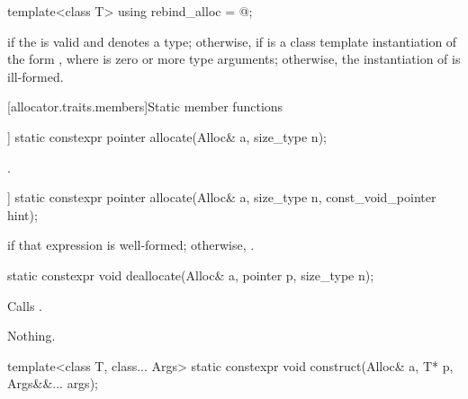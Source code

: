 %
\begin{itemdecl}
template<class T> using rebind_alloc = @\seebelow@;
\end{itemdecl}

\begin{itemdescr}
\pnum
\templalias {} if
the   is valid and denotes a
type; otherwise,
 if  is a class template instantiation
of the form , where  is zero or more type arguments;
otherwise, the instantiation of  is ill-formed.
\end{itemdescr}

[allocator.traits.members]{Static member functions}

%
\begin{itemdecl}
[[nodiscard]] static constexpr pointer allocate(Alloc& a, size_type n);
\end{itemdecl}

\begin{itemdescr}
\pnum
\returns
{}.
\end{itemdescr}

%
\begin{itemdecl}
[[nodiscard]] static constexpr pointer allocate(Alloc& a, size_type n, const_void_pointer hint);
\end{itemdecl}

\begin{itemdescr}
\pnum
\returns
{} if that expression is well-formed; otherwise, .
\end{itemdescr}

%
\begin{itemdecl}
static constexpr void deallocate(Alloc& a, pointer p, size_type n);
\end{itemdecl}

\begin{itemdescr}
\pnum
\effects
Calls .

\pnum
\throws
Nothing.
\end{itemdescr}

%
\begin{itemdecl}
template<class T, class... Args>
  static constexpr void construct(Alloc& a, T* p, Args&&... args);
\end{itemdecl}

